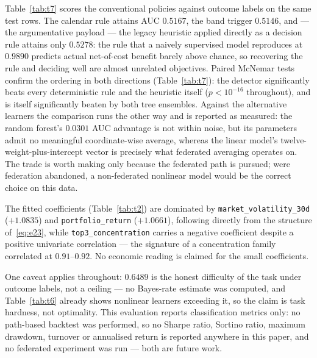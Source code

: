 Table~\ref{tab:t7} scores the conventional policies against outcome labels on
the same test rows. The calendar rule attains AUC $0.5167$, the band trigger
$0.5146$, and --- the argumentative payload --- the legacy heuristic applied
directly as a decision rule attains only $0.5278$: the rule that a naively
supervised model reproduces at $0.9890$ predicts actual net-of-cost benefit
barely above chance, so recovering the rule and deciding well are almost
unrelated objectives. Paired McNemar tests confirm the ordering in both
directions (Table~\ref{tab:t7}): the detector significantly beats every
deterministic rule and the heuristic itself ($p<10^{-16}$ throughout), and is
itself significantly beaten by both tree ensembles. Against the alternative
learners the comparison runs the other way and is reported as measured: the
random forest's $0.0301$ AUC advantage is not within noise, but its
parameters admit no meaningful coordinate-wise average, whereas the linear
model's twelve-weight-plus-intercept vector is precisely what federated
averaging operates on. The trade is worth making only because the federated
path is pursued; were federation abandoned, a non-federated nonlinear model
would be the correct choice on this data.

The fitted coefficients (Table~\ref{tab:t2}) are dominated by
\texttt{market\_volatility\_30d} ($+1.0835$) and \texttt{portfolio\_return}
($+1.0661$), following directly from the structure of~\eqref{eq:e23}, while
\texttt{top3\_concentration} carries a negative coefficient despite a positive
univariate correlation --- the signature of a concentration family correlated
at $0.91$--$0.92$. No economic reading is claimed for the small coefficients.

One caveat applies throughout: $0.6489$ is the honest difficulty of the task
under outcome labels, not a ceiling --- no Bayes-rate estimate was computed, and
Table~\ref{tab:t6} already shows nonlinear learners exceeding it, so the claim
is task hardness, not optimality. This evaluation reports classification
metrics only: no path-based backtest was performed, so no Sharpe ratio,
Sortino ratio, maximum drawdown, turnover or annualised return is reported
anywhere in this paper, and no federated experiment was run --- both are
future work.

